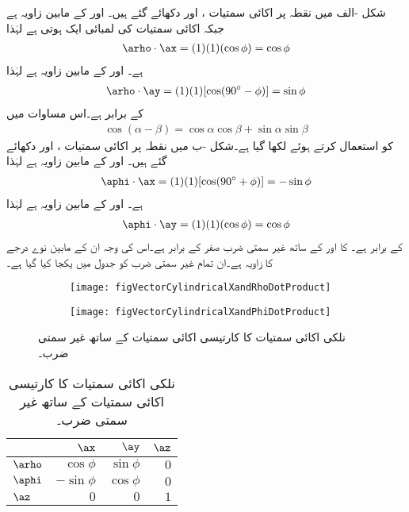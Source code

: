 شکل -الف میں نقطہ  پر اکائی سمتیات ،  اور  دکھائے گئے ہیں۔ اور   کے مابین زاویہ  ہے جبکہ اکائی سمتیات کی لمبائی ایک ہوتی ہے لہٰذا
\begin{align}
\arho \cdot \ax=(1)(1)(\cos \phi)=\cos \phi
\end{align}
ہے۔ اور   کے مابین زاویہ  ہے  لہٰذا
\begin{align}
\arho \cdot \ay=(1)(1)[\cos (90^\circ-\phi)]=\sin \phi
\end{align}
کے برابر ہے۔اس مساوات میں
\begin{align*}
\cos(\alpha-\beta)=\cos \alpha \cos \beta+\sin \alpha \sin \beta
\end{align*}
کو استعمال کرتے ہوئے  لکھا گیا ہے۔شکل -ب میں نقطہ  پر اکائی سمتیات ،  اور  دکھائے گئے ہیں۔ اور   کے مابین زاویہ  ہے  لہٰذا
\begin{align}
\aphi \cdot \ax=(1)(1)[\cos (90^\circ+\phi)]=-\sin \phi
\end{align}
ہے۔ اور   کے مابین زاویہ  ہے  لہٰذا
\begin{align}
\aphi \cdot \ay=(1)(1)(\cos \phi)=\cos \phi
\end{align}
کے برابر ہے۔ کا  اور  کے ساتھ غیر سمتی ضرب صفر کے برابر ہے۔اس کی وجہ ان کے مابین نوے درجے کا زاویہ ہے۔ان تمام غیر سمتی ضرب کو جدول  میں یکجا کیا گیا ہے۔
\begin{figure}
\centering
\begin{subfigure}{0.5\textwidth}
\centering
\texttt{[image: figVectorCylindricalXandRhoDotProduct]}
\end{subfigure}%
%
\begin{subfigure}{0.5\textwidth}
\centering
\texttt{[image: figVectorCylindricalXandPhiDotProduct]}
\end{subfigure}%
\caption{نلکی اکائی سمتیات کا کارتیسی اکائی سمتیات کے ساتھ غیر سمتی ضرب۔}
\label{شکل_سمتیہ_نلکی_کارتیسی_اکائی_غیر_سمتی_ضرب}
\end{figure}%
%
%
\begin{table}
\caption{نلکی اکائی سمتیات کا کارتیسی اکائی سمتیات کے ساتھ غیر سمتی ضرب۔}
\centering
\begin{tabular}{l | r r r}
 & $\ax$ & $\ay$ & $\az$ \\
\hline
$\arho$ & $\cos \phi$ & $\sin \phi $& $0$\\
$\aphi$ &$-\sin \phi$ &$ \cos \phi$ &$ 0$\\
$\az$ & $0$ &$ 0$ &$1$
\end{tabular}
\label{جدول_سمتیہ_نلکی_کارتیسی_اکائی_غیر-سمتی_ضرب}
\end{table}

